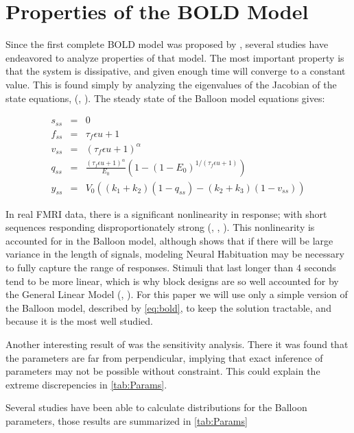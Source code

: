 \section{Properties of the BOLD Model}
\label{sec:BOLD Analysis}
Since the first complete BOLD model was proposed by \cite{Friston2002}, 
several studies have endeavored to analyze properties of that model. 
The most important property is that the system is dissipative, and given
enough time will converge to a constant value. This is found simply by
analyzing the eigenvalues of the Jacobian of the state equations, 
(\cite{Deneux2006}, \cite{Hu2009}). The steady state of the Balloon
model equations gives:

\begin{eqnarray}
s_{ss} &=& 0 \nonumber \\
f_{ss} &=& \tau_f\epsilon u + 1\nonumber \\
v_{ss} &=& (\tau_f\epsilon u + 1)^\alpha\nonumber \\
q_{ss} &=& \frac{(\tau_f\epsilon u + 1)^\alpha}{E_0}(1-(1-E_0)^{1/(\tau_f\epsilon u + 1)})\nonumber \\
y_{ss} &=& V_0((k_1+k_2)(1-q_{ss}) - (k_2+k_3)(1-v_{ss}))
\label{eq:steadystate}
\end{eqnarray}

In real FMRI data, there is a significant nonlinearity in response; with short sequences
responding disproportionately strong (\cite{Birn2001}, \cite{Wager2005}, \cite{Deneux2006}).
This nonlinearity is accounted for in the Balloon model, although \cite{Deneux2006}
shows that if there will be large variance in the length of signals, 
modeling Neural Habituation may be necessary to fully capture the range of responses. 
Stimuli that last longer than 4 seconds 
tend to be more linear, which is why block designs are so well accounted for
by the General Linear Model (\cite{Birn2001}, \cite{Deneux2006}). For this 
paper we will use only a simple version of the Balloon model, described by
\autoref{eq:bold}, to keep the solution tractable, and because it is the most
well studied. 

Another interesting result of \cite{Deneux2006} was the sensitivity analysis.
There it was found that the parameters are far from perpendicular,
implying that exact inference of parameters may not be possible without
constraint. This could explain the extreme discrepencies in \autoref{tab:Params}.

Several studies have been able to calculate distributions for the 
Balloon parameters, those results are summarized in \autoref{tab:Params}

